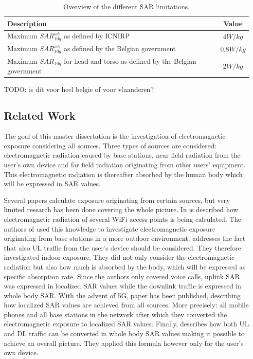 \begin{table}[]
\begin{tabular}{|l|c|}
\hline
\textbf{Description} & \textbf{Value} \\ \hline
Maximum $SAR^{wb}_{10g}$ as defined by \gls{ICNIRP}                           &  $4 W/kg$              \\ \hline
Maximum $SAR^{wb}_{10g}$ as defined by the Belgian government                  & $0.8 W/kg$               \\ \hline
Maximum $SAR_{10g}$ for head and torso as defined by the Belgian government                  & $2 W/kg$               \\ \hline
\end{tabular}
\label{table:overviewSARValues}
\caption{Overview of the different \gls{SAR} limitations.}
\end{table}
TODO:  is dit voor heel belgie of voor vlaanderen?


\subsection{Related Work} %
\label{sub:general}
The goal of this master dissertation is the investigation of electromagnetic exposure considering all sources. Three types of sources are considered: electromagnetic radiation 
caused by base stations, near field radiation from the user's own device and far field radiation originating from other users' equipment. This electromagnetic radiation is thereafter
absorbed by the human body which will be expressed in SAR values.

Several papers calculate exposure originating from certain sources, but very  limited research has been done covering the whole picture.
In \cite{J6_originalExposureFormula} is described how electromagnetic radiation of several WiFi access points is being calculated. The authors of \cite{J1} used this knowledge 
to investigate electromagnetic exposure originating from base stations in a more outdoor environment. \cite{J10_RDP, J10.1} addresses the fact that 
also \gls{UL} traffic from the user's device should be considered. They therefore investigated indoor exposure. They did not only consider the electromagnetic radiation
but also how much is absorbed by the body, which will be expressed as specific absorption rate. Since the authors only covered voice calls,
uplink SAR was expressed in localized SAR values while the downlink traffic is expressed in whole body SAR. With the advent of 5G, paper \cite{J17_kuehn2019modelling} has been 
published, describing how localized SAR values are achieved from all sources. More precisely: all mobile phones and all base stations in the network after which they converted the electromagnetic 
exposure to localized SAR values.
Finally, \cite{J22_plets2015joint} describes how both \gls{UL} and \gls{DL} traffic can be converted in whole body SAR values making it possible to achieve an overall picture. They applied this formula 
however only for the user's own device.

